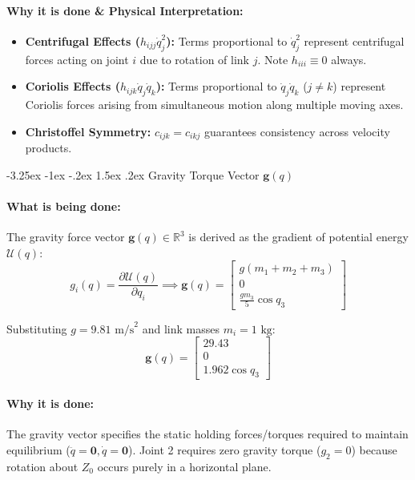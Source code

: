 ﻿\documentclass[11pt, a4paper]{article}
\makeatletter
\renewcommand{\subsection}{\@startsection{subsection}{2}{\z@}%
    {-3.25ex \@plus -1ex \@minus -.2ex}%
    {1.5ex \@plus .2ex}%
    {\normalfont\large\bfseries\color{brandaccent}}}
\makeatother
\begin{document}
\paragraph{Why it is done \& Physical Interpretation:}
\begin{itemize}[leftmargin=1.5em]
    \item \textbf{Centrifugal Effects ($h_{ijj}\dot{q}_j^2$):} Terms proportional to $\dot{q}_j^2$ represent centrifugal forces acting on joint $i$ due to rotation of link $j$. Note $h_{iii} \equiv 0$ always.
    \item \textbf{Coriolis Effects ($h_{ijk}\dot{q}_j\dot{q}_k$):} Terms proportional to $\dot{q}_j\dot{q}_k$ ($j \neq k$) represent Coriolis forces arising from simultaneous motion along multiple moving axes.
    \item \textbf{Christoffel Symmetry:} $c_{ijk} = c_{ikj}$ guarantees consistency across velocity products.
\end{itemize}

\subsection{Gravity Torque Vector \texorpdfstring{$\mathbf{g}(q)$}{g(q)}}
\paragraph{What is being done:}
The gravity force vector $\mathbf{g}(q) \in \mathbb{R}^3$ is derived as the gradient of potential energy $\mathcal{U}(q)$:
\begin{equation}
    g_i(q) = \frac{\partial \mathcal{U}(q)}{\partial q_i} \implies \mathbf{g}(q) = \begin{bmatrix} g(m_1 + m_2 + m_3) \\[0.4em] 0 \\[0.4em] \frac{g m_3}{5}\cos q_3 \end{bmatrix}
\end{equation}

Substituting $g = 9.81\text{ m/s}^2$ and link masses $m_i = 1\text{ kg}$:
\begin{equation}
    \mathbf{g}(q) = \begin{bmatrix} 29.43 \\[0.3em] 0 \\[0.3em] 1.962\cos q_3 \end{bmatrix}
\end{equation}

\paragraph{Why it is done:}
The gravity vector specifies the static holding forces/torques required to maintain equilibrium ($\ddot{q}=\mathbf{0}, \dot{q}=\mathbf{0}$). Joint 2 requires zero gravity torque ($g_2 = 0$) because rotation about $Z_0$ occurs purely in a horizontal plane.
\end{document}
